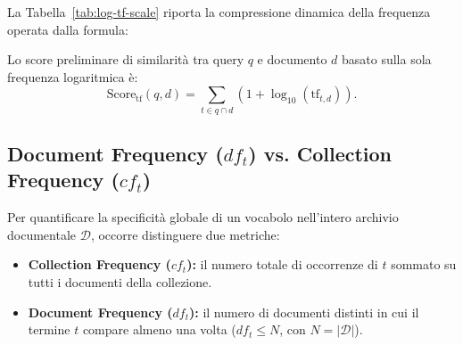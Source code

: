 La Tabella~\ref{tab:log-tf-scale} riporta la compressione dinamica della frequenza operata dalla formula:
\begin{table}[H]
\centering
\small
{}
\caption{Scala di compressione del peso tramite Term Frequency logaritmica.}
\label{tab:log-tf-scale}
\end{table}

Lo score preliminare di similarit\`a tra query $q$ e documento $d$ basato sulla sola frequenza logaritmica \`e:
\begin{equation}
\text{Score}_{\text{tf}}(q, d) = \sum_{t \in q \cap d} \left(1 + \log_{10}(\text{tf}_{t,d})\right).
\end{equation}

\subsection[Document Frequency vs Collection Frequency]{Document Frequency (\texorpdfstring{$df_t$}{df\_t}) vs. Collection Frequency (\texorpdfstring{$cf_t$}{cf\_t})}
Per quantificare la specificit\`a globale di un vocabolo nell'intero archivio documentale $\mathcal{D}$, occorre distinguere due metriche:
\begin{itemize}
    \item \textbf{Collection Frequency ($cf_t$):} il numero totale di occorrenze di $t$ sommato su tutti i documenti della collezione.
    \item \textbf{Document Frequency ($df_t$):} il numero di documenti distinti in cui il termine $t$ compare almeno una volta ($df_t \le N$, con $N = |\mathcal{D}|$).
\end{itemize}

